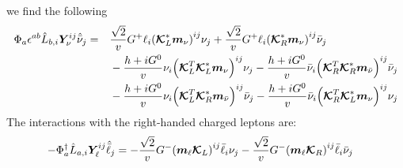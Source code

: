 we find the following
\begin{align}
	\Phi_{a}\epsilon^{ab}\hat{L}_{b,i}\bm{Y}^{ij}_{\nu}\hat{\bar{\nu}}_{j} =
	 & \quad
	\frac{\sqrt{2}}{v}G^{+}\ell_{i}{\qty(\bm{\mathcal{K}}_{L}^{*}\bm{m}_{\nu})}^{ij}\nu_{j}
	+ \frac{\sqrt{2}}{v}G^{+}\ell_{i}{\qty(\bm{\mathcal{K}}_{R}^{*}\bm{m}_{\nu})}^{ij}\bar{\nu}_{j}
	\\
	 & \quad
	- \frac{h+iG^{0}}{v}\nu_i\qty(
	\bm{\mathcal{K}}_{L}^{T}\bm{\mathcal{K}}_{L}^{*}\bm{m}_{\nu}
	)^{ij}\nu_{j}
	- \frac{h+iG^{0}}{v}\bar{\nu}_i\qty(
	\bm{\mathcal{K}}_{R}^{T}\bm{\mathcal{K}}_{R}^{*}\bm{m}_{\bar{\nu}}
	)^{ij}\bar{\nu}_{j}
	\notag   \\
	 & \quad
	- \frac{h+iG^{0}}{v}\nu_i\qty(
	\bm{\mathcal{K}}_{L}^{T}\bm{\mathcal{K}}_{R}^{*}\bm{m}_{\bar{\nu}}
	)^{ij}\bar{\nu}_{j}
	- \frac{h+iG^{0}}{v}\bar{\nu}_i\qty(
	\bm{\mathcal{K}}_{R}^{T}\bm{\mathcal{K}}_{L}^{*}\bm{m}_{\nu}
	)^{ij}\nu_{j}
	\notag
\end{align}
The interactions with the right-handed charged leptons are:
\begin{align}
	-\Phi_{a}^{\dagger}\hat{L}_{a,i}\bm{Y}^{ij}_{\ell}\hat{\bar{\ell}}_{j}
	 & =
	-\frac{\sqrt{2}}{v}G^{-}\qty(\bm{m}_{\ell}\bm{\mathcal{K}}_{L})^{ij}\bar{\ell}_{i}\nu_{j}
	-\frac{\sqrt{2}}{v}G^{-}\qty(\bm{m}_{\ell}\bm{\mathcal{K}}_{R})^{ij}\bar{\ell}_{i}\bar{\nu}_{j}
\end{align}

